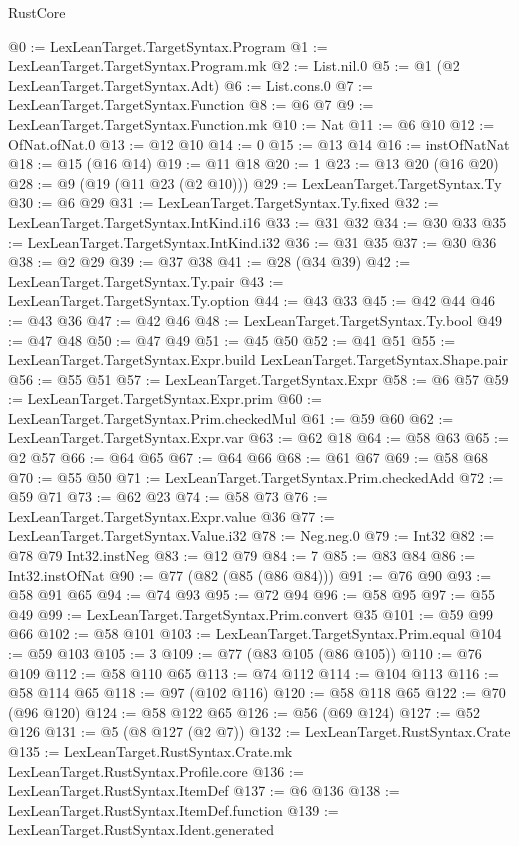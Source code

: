 \begin{lexlean}{RustCore}
\begin{coremodule}
@0 := LexLeanTarget.TargetSyntax.Program
@1 := LexLeanTarget.TargetSyntax.Program.mk
@2 := List.nil.{0}
@5 := @1 (@2 LexLeanTarget.TargetSyntax.Adt)
@6 := List.cons.{0}
@7 := LexLeanTarget.TargetSyntax.Function
@8 := @6 @7
@9 := LexLeanTarget.TargetSyntax.Function.mk
@10 := Nat
@11 := @6 @10
@12 := OfNat.ofNat.{0}
@13 := @12 @10
@14 := 0
@15 := @13 @14
@16 := instOfNatNat
@18 := @15 (@16 @14)
@19 := @11 @18
@20 := 1
@23 := @13 @20 (@16 @20)
@28 := @9 (@19 (@11 @23 (@2 @10)))
@29 := LexLeanTarget.TargetSyntax.Ty
@30 := @6 @29
@31 := LexLeanTarget.TargetSyntax.Ty.fixed
@32 := LexLeanTarget.TargetSyntax.IntKind.i16
@33 := @31 @32
@34 := @30 @33
@35 := LexLeanTarget.TargetSyntax.IntKind.i32
@36 := @31 @35
@37 := @30 @36
@38 := @2 @29
@39 := @37 @38
@41 := @28 (@34 @39)
@42 := LexLeanTarget.TargetSyntax.Ty.pair
@43 := LexLeanTarget.TargetSyntax.Ty.option
@44 := @43 @33
@45 := @42 @44
@46 := @43 @36
@47 := @42 @46
@48 := LexLeanTarget.TargetSyntax.Ty.bool
@49 := @47 @48
@50 := @47 @49
@51 := @45 @50
@52 := @41 @51
@55 := LexLeanTarget.TargetSyntax.Expr.build LexLeanTarget.TargetSyntax.Shape.pair
@56 := @55 @51
@57 := LexLeanTarget.TargetSyntax.Expr
@58 := @6 @57
@59 := LexLeanTarget.TargetSyntax.Expr.prim
@60 := LexLeanTarget.TargetSyntax.Prim.checkedMul
@61 := @59 @60
@62 := LexLeanTarget.TargetSyntax.Expr.var
@63 := @62 @18
@64 := @58 @63
@65 := @2 @57
@66 := @64 @65
@67 := @64 @66
@68 := @61 @67
@69 := @58 @68
@70 := @55 @50
@71 := LexLeanTarget.TargetSyntax.Prim.checkedAdd
@72 := @59 @71
@73 := @62 @23
@74 := @58 @73
@76 := LexLeanTarget.TargetSyntax.Expr.value @36
@77 := LexLeanTarget.TargetSyntax.Value.i32
@78 := Neg.neg.{0}
@79 := Int32
@82 := @78 @79 Int32.instNeg
@83 := @12 @79
@84 := 7
@85 := @83 @84
@86 := Int32.instOfNat
@90 := @77 (@82 (@85 (@86 @84)))
@91 := @76 @90
@93 := @58 @91 @65
@94 := @74 @93
@95 := @72 @94
@96 := @58 @95
@97 := @55 @49
@99 := LexLeanTarget.TargetSyntax.Prim.convert @35
@101 := @59 @99 @66
@102 := @58 @101
@103 := LexLeanTarget.TargetSyntax.Prim.equal
@104 := @59 @103
@105 := 3
@109 := @77 (@83 @105 (@86 @105))
@110 := @76 @109
@112 := @58 @110 @65
@113 := @74 @112
@114 := @104 @113
@116 := @58 @114 @65
@118 := @97 (@102 @116)
@120 := @58 @118 @65
@122 := @70 (@96 @120)
@124 := @58 @122 @65
@126 := @56 (@69 @124)
@127 := @52 @126
@131 := @5 (@8 @127 (@2 @7))
@132 := LexLeanTarget.RustSyntax.Crate
@135 := LexLeanTarget.RustSyntax.Crate.mk LexLeanTarget.RustSyntax.Profile.core
@136 := LexLeanTarget.RustSyntax.ItemDef
@137 := @6 @136
@138 := LexLeanTarget.RustSyntax.ItemDef.function
@139 := LexLeanTarget.RustSyntax.Ident.generated

\end{coremodule}
\end{lexlean}
